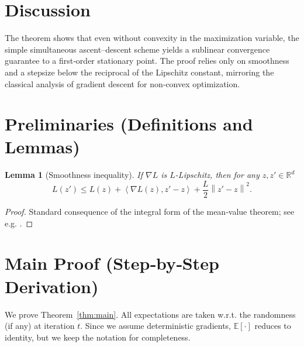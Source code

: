 \documentclass{article}
\newtheorem{lemma}{Lemma}
\newcommand{\E}{\mathbb{E}}
\newcommand{\norm}[1]{\left\| #1 \right\|}
\newcommand{\inner}[2]{\left\langle #1, #2 \right\rangle}
\begin{document}
\section*{Discussion}
The theorem shows that even without convexity in the maximization variable,
the simple simultaneous ascent–descent scheme yields a sublinear
convergence guarantee to a first‑order stationary point. The proof relies only on smoothness and a stepsize below the reciprocal of the Lipschitz constant, mirroring the classical analysis of gradient descent for non‑convex optimization.

\section*{Preliminaries (Definitions and Lemmas)}
\begin{lemma}[Smoothness inequality]\label{lem:smooth}
If \(\nabla L\) is \(L\)-Lipschitz, then for any \(z,z'\in\mathbb{R}^{d}\)
\[
L(z')\le L(z)+\inner{\nabla L(z)}{z'-z}+\frac{L}{2}\norm{z'-z}^{2}.
\tag{4}
\]
\end{lemma}
\begin{proof}
Standard consequence of the integral form of the mean‑value theorem; see e.g. \cite{Nesterov2004}.
\end{proof}

\section*{Main Proof (Step‑by‑Step Derivation)}
We prove Theorem~\ref{thm:main}. All expectations are taken w.r.t. the randomness (if any) at iteration \(t\). Since we assume deterministic gradients, \(\E[\cdot]\) reduces to identity, but we keep the notation for completeness.
\end{document}
